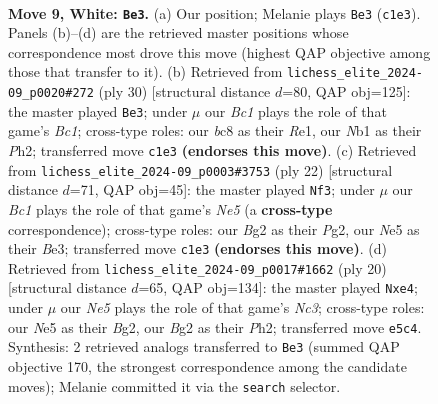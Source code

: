 \documentclass[11pt]{article}
\begin{document}
\clearpage

\begin{figure}[p]\centering
\begin{subfigure}{0.46\textwidth}\centering
\resizebox{\linewidth}{!}{%
\newchessgame
\chessboard[
  setfen={rnbq1rk1/ppp1bppp/1n2p3/4N3/2pP4/6P1/PP2PPBP/RNBQR1K1 w - - 4 9},
  showmover=false,
  pgfstyle=straightmove, color=movearrow, markmove={c1-e3}
]}
\caption{}
\end{subfigure}\hfill
\begin{subfigure}{0.46\textwidth}\centering
\resizebox{\linewidth}{!}{%
\newchessgame
\chessboard[
  setfen={2rq1rk1/1p2ppbp/p1p1bnp1/4N3/3P4/2P5/PP3PPP/R1BQRBK1 w - - 10 16},
  showmover=false,
  pgfstyle=straightmove, color=movearrow, markmove={c1-e3}
]}
\caption{}
\end{subfigure}
\\[4pt]
\begin{subfigure}{0.46\textwidth}\centering
\resizebox{\linewidth}{!}{%
\newchessgame
\chessboard[
  setfen={r1bq1rk1/1pp1b1pp/p1p1np2/4N3/2PP4/4B3/PP3PPP/RN1QR1K1 w - - 0 12},
  showmover=false,
  pgfstyle=straightmove, color=movearrow, markmove={e5-f3}
]}
\caption{}
\end{subfigure}\hfill
\begin{subfigure}{0.46\textwidth}\centering
\resizebox{\linewidth}{!}{%
\newchessgame
\chessboard[
  setfen={rn1q1rk1/pb2bppp/1pp2n2/4N3/3Pp3/2N3P1/PP3PBP/R1BQ1RK1 w - - 0 11},
  showmover=false,
  pgfstyle=straightmove, color=movearrow, markmove={c3-e4}
]}
\caption{}
\end{subfigure}
\caption{\textbf{Move 9, White: \texttt{Be3}.} (a) Our position; Melanie plays \texttt{Be3} (\texttt{c1e3}). Panels (b)--(d) are the retrieved master positions whose correspondence most drove this move (highest QAP objective among those that transfer to it). (b) Retrieved from \texttt{lichess\_elite\_2024-09\_p0020\#272} (ply 30) [structural distance $d$=80, QAP obj=125]: the master played \texttt{Be3}; under $\mu$ our \emph{Bc1} plays the role of that game's \emph{Bc1}; cross-type roles: our \emph{b}c8 as their \emph{R}e1, our \emph{N}b1 as their \emph{P}h2; transferred move \texttt{c1e3} \textbf{(endorses this move)}. (c) Retrieved from \texttt{lichess\_elite\_2024-09\_p0003\#3753} (ply 22) [structural distance $d$=71, QAP obj=45]: the master played \texttt{Nf3}; under $\mu$ our \emph{Bc1} plays the role of that game's \emph{Ne5} (a \textbf{cross-type} correspondence); cross-type roles: our \emph{B}g2 as their \emph{P}g2, our \emph{N}e5 as their \emph{B}e3; transferred move \texttt{c1e3} \textbf{(endorses this move)}. (d) Retrieved from \texttt{lichess\_elite\_2024-09\_p0017\#1662} (ply 20) [structural distance $d$=65, QAP obj=134]: the master played \texttt{Nxe4}; under $\mu$ our \emph{Ne5} plays the role of that game's \emph{Nc3}; cross-type roles: our \emph{N}e5 as their \emph{B}g2, our \emph{B}g2 as their \emph{P}h2; transferred move \texttt{e5c4}. Synthesis: 2 retrieved analogs transferred to \texttt{Be3} (summed QAP objective 170, the strongest correspondence among the candidate moves); Melanie committed it via the \texttt{search} selector.}
\label{fig:thought-m16}
\end{figure}
\end{document}
